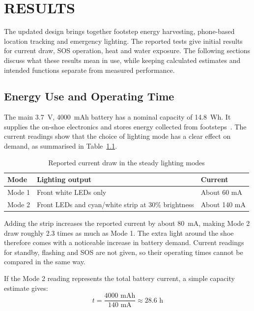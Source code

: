 \chapter{RESULTS}
The updated design brings together footstep energy harvesting, phone-based location tracking and emergency lighting. The reported tests give initial results for current draw, SOS operation, heat and water exposure. The following sections discuss what these results mean in use, while keeping calculated estimates and intended functions separate from measured performance.

\section{Energy Use and Operating Time}
The main 3.7~V, 4000~mAh battery has a nominal capacity of 14.8~Wh. It supplies the on-shoe electronics and stores energy collected from footsteps~\cite{ahmed2024smart}. The current readings show that the choice of lighting mode has a clear effect on demand, as summarised in Table~\ref{tab:current_draw_steady_lighting}.

\begin{table}[H]
    \centering
    \caption{Reported current draw in the steady lighting modes}\label{tab:current_draw_steady_lighting}
    \begin{tabularx}{\textwidth}{
        >{\hsize=0.50\hsize\raggedright\arraybackslash}X
        >{\hsize=1.80\hsize\raggedright\arraybackslash}X
        >{\hsize=0.7\hsize\raggedright\arraybackslash}X
    }
    \toprule
    \textbf{Mode} & \textbf{Lighting output} & \textbf{Current} \\
    \midrule
    Mode 1 & Front white LEDs only & About 60 mA \\
    \addlinespace
    Mode 2 & Front LEDs and cyan/white strip at 30\% brightness & About 140 mA \\
    \bottomrule
    \end{tabularx}
\end{table}

Adding the strip increases the reported current by about 80~mA, making Mode 2 draw roughly 2.3 times as much as Mode 1. The extra light around the shoe therefore comes with a noticeable increase in battery demand. Current readings for standby, flashing and SOS are not given, so their operating times cannot be compared in the same way.

If the Mode 2 reading represents the total battery current, a simple capacity estimate gives:
\begin{equation}
    t = \frac{4000 \text{ mAh}}{140 \text{ mA}} \approx 28.6 \text{ h}
    \label{eq:battery_time}
\end{equation}

